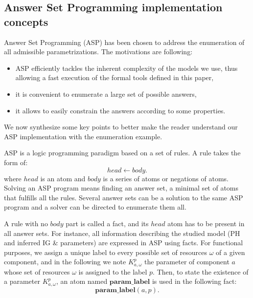 \subsection{Answer Set Programming implementation concepts}



\newcommand{\ti}[1]{\texttt{\textit{#1}}}
\newcommand{\aspil}[1]{\texttt{#1}}
\newcommand{\asp}[1]{\begin{itemize} \item[] \aspil{#1} \end{itemize}}

\newcommand{\atom}{\mathbf}
\newcommand{\la}{\leftarrow}
\newcommand{\var}[1]{#1}
\newcommand{\nota}{\neg}

Answer Set Programming (ASP) \cite{Baral03} has been chosen to address the enumeration of all admissible parametrizations.
The motivations are following:
\begin{itemize}
  \item ASP efficiently tackles the inherent complexity of the models we use, thus allowing a fast execution of the formal tools defined in this paper,
  \item it is convenient to enumerate a large set of possible answers,
  \item it allows to easily constrain the answers according to some properties.
\end{itemize}
We now synthesize some key points to better make the reader understand our ASP implementation with the enumeration example.

ASP is a logic programming paradigm based on a set of rules.
A rule takes the form of:
$$head \la body.$$
where $head$ is an atom and $body$ is a series of atoms or negations of atoms.
Solving an ASP program means finding an answer set, \ie a minimal set of atoms that fulfills all the rules.
Several answer sets can be a solution to the same ASP program and a solver can be directed to enumerate them all.

A rule with no $body$ part is called a fact, and its $head$ atom has to be present in all answer sets.
For instance, all information describing the studied model (PH and inferred IG \& parameters) are expressed in ASP using facts.
For functional purposes, we assign a unique label to every possible set of resources $\omega$ of a given component,
and in the following we note $K^p_{a,\omega}$ the parameter of component $a$ whose set of resources $\omega$ is assigned to the label $p$.
Then, to state the existence of a parameter $K^p_{a,\omega}$, an atom named $\atom{param\_label}$ is used in the following fact:
$$\atom{param\_label}(a, p).$$

